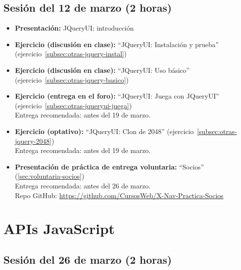 \documentclass[a4paper,12pt]{report}
\begin{document}
\subsection{Sesión del 12 de marzo (2 horas)}

\begin{itemize}
\item \textbf{Presentación:} JQueryUI: introducción
\item \textbf{Ejercicio (discusión en clase):} ``JQueryUI: Instalación y prueba'' (ejercicio~\ref{subsec:otras-jquery-instal})
\item \textbf{Ejercicio (discusión en clase):} ``JQueryUI: Uso básico'' (ejercicio~\ref{subsec:otras-jquery-basico}) \\
\item \textbf{Ejercicio (entrega en el foro):} ``JQueryUI: Juega con JQueryUI'' (ejercicio~\ref{subsec:otras-jqueryui-juega}) \\
  Entrega recomendada: antes del 19 de marzo.
\item \textbf{Ejercicio (optativo):} ``JQueryUI: Clon de 2048'' (ejercicio~\ref{subsec:otras-jquery-2048}) \\
  Entrega recomendada: antes del 19 de marzo.
\item \textbf{Presentación de práctica de entrega voluntaria:} ``Socios'' (\ref{sec:voluntaria-socios}) \\
  Entrega recomendada: antes del 26 de marzo. \\
  Repo GitHub: \url{https://github.com/CursosWeb/X-Nav-Practica-Socios}
\end{itemize}


\section{APIs JavaScript}

\subsection{Sesión del 26 de marzo (2 horas)}
\end{document}
